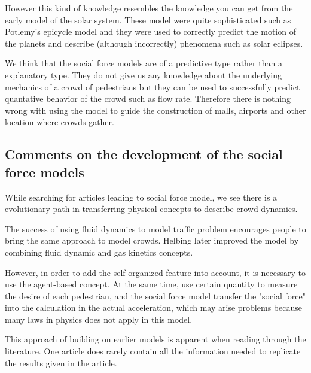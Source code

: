 However this kind of knowledge resembles the knowledge you can get from 
the early model of the solar system. These model were quite sophisticated 
such as Potlemy's epicycle model and they were used to correctly predict the 
motion of the planets and describe (although incorrectly) phenomena such as 
solar eclipses.

We think that the social force models are of a predictive type rather than 
a explanatory type. They do not give us any knowledge about the underlying 
mechanics of a crowd of pedestrians but they can be used to successfully 
predict quantative behavior of the crowd such as  flow rate. Therefore there 
is nothing wrong with using the model to guide the construction of malls, airports 
and other location where crowds gather.

\subsection{Comments on the development of the social force models}
\label{subsec:development}
While searching for articles leading to social force model, we see there is a 
evolutionary path in transferring physical concepts to describe crowd dynamics.

The success of using fluid dynamics to model traffic problem encourages 
people to bring the same approach to model crowds. Helbing later improved the  
model by combining fluid dynamic and gas kinetics concepts\cite{social-force}. 

However, in order to add the self-organized feature into account, it is necessary 
to use the agent-based concept.  At the same time, use certain quantity to measure
the desire of each pedestrian, and the social force model transfer the "social force" into 
the calculation in the actual acceleration, which may arise problems because many laws 
in physics does not apply in this model. 

This approach of building on earlier models is apparent when reading through the 
literature. One article does rarely contain all the information needed to replicate 
the results given in the article.
